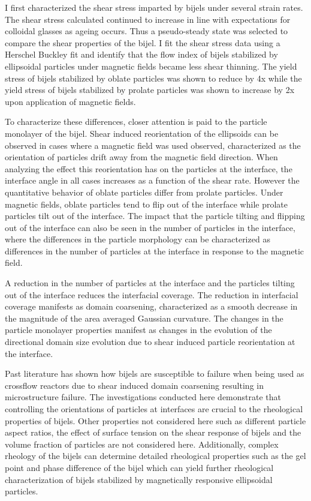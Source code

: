 I first characterized the shear stress imparted by bijels under several strain rates. The shear stress calculated continued to increase in line with expectations
for colloidal glasses as ageing occurs. Thus a pseudo-steady state was selected to compare the shear properties of the bijel.
I fit the shear stress data using a Herschel Buckley fit and identify that the flow index of bijels stabilized by ellipsoidal 
particles under magnetic fields became less shear thinning. The yield stress of bijels stabilized by oblate particles was shown to reduce by 4x while the yield stress
of bijels stabilized by prolate particles was shown to increase by 2x upon application of magnetic fields.

To characterize these differences, closer attention is paid to the particle monolayer of the bijel. Shear induced reorientation of the ellipsoids can be observed in cases
where a magnetic field was used observed, characterized as the orientation of particles drift away from the magnetic field direction. When analyzing the effect this reorientation
has on the particles at the interface, the interface angle in all cases increases as a function of the shear rate. However the quantitative behavior of oblate particles differ
from prolate particles. Under magnetic fields, oblate particles tend to flip out of the interface while prolate particles tilt out of the interface. The impact that
the particle tilting and flipping out of the interface can also be seen in the number of particles in the interface, where the differences in the particle morphology 
can be characterized as differences in the number of particles at the interface in response to the magnetic field. 

A reduction in the number of particles at the interface and the particles tilting out of the interface reduces the interfacial coverage. The reduction in interfacial
coverage manifests as domain coarsening, characterized as a smooth decrease in the magnitude of the area averaged Gaussian curvature. The changes in the particle monolayer
properties manifest as changes in the evolution of the directional domain size evolution due to shear induced particle reorientation at the interface. 

Past literature
has shown how bijels are susceptible to failure when being used as crossflow reactors due to shear induced domain coarsening resulting in microstructure failure. 
\cite{boakye-ansah_controlling_2020} The investigations conducted here demonstrate that controlling the orientations of particles at interfaces are crucial to 
the rheological properties of bijels. Other properties not considered here such as different particle aspect ratios, the effect of surface tension on the shear response of
bijels and the volume fraction of particles are not considered here. Additionally, complex rheology of the bijels can determine detailed rheological properties such as the
gel point and phase difference of the bijel which can yield further rheological characterization of bijels stabilized by magnetically responsive ellipsoidal particles.